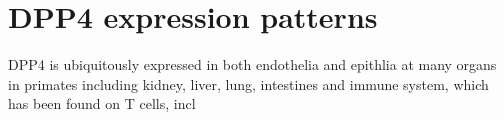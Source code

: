 \section{DPP4 expression patterns}
DPP4 is ubiquitously expressed in both endothelia and epithlia at many organs in primates including kidney, liver, lung, intestines and immune system, which has been found on T cells, incl
